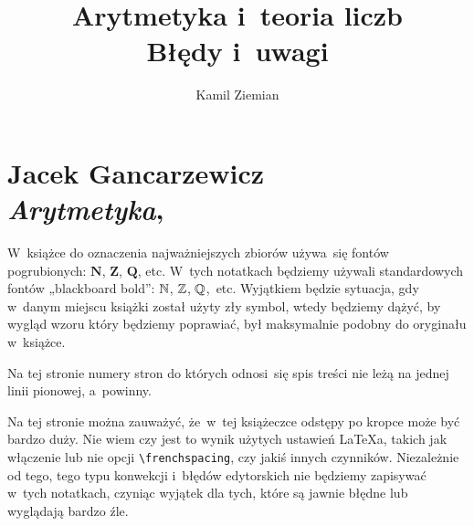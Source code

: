 \documentclass[a4paper,11pt]{article}
\title{Arytmetyka i~teoria liczb \\
  {\Large Błędy i~uwagi}}
\author{Kamil Ziemian}
\numberwithin{equation}{section}
\begin{document}





\maketitle %





\section{ %
  Jacek Gancarzewicz \\
  \textit{Arytmetyka}, \cite{GancarzewiczArytmetyka2000}}

\vspace{0em}



\vspace{0em}


\noindent
W~książce do oznaczenia najważniejszych zbiorów używa~się fontów
pogrubionych: $\mathbf{N}$, $\mathbf{Z}$, $\mathbf{Q}$, etc. W~tych
notatkach będziemy używali standardowych fontów „blackboard bold”: $\mathbb{N}$,
$\mathbb{Z}$, $\mathbb{Q}$,~etc. Wyjątkiem będzie sytuacja, gdy w~danym miejscu
książki został użyty zły symbol, wtedy będziemy dążyć, by wygląd wzoru który
będziemy poprawiać, był maksymalnie podobny do oryginału w~książce.

\VerSpaceFour






\vspace{0em}


\noindent
{} Na tej stronie numery stron do których odnosi~się spis treści nie
leżą na jednej linii pionowej, a~powinny.

\VerSpaceFour





\noindent
{} Na tej stronie można zauważyć, że~w~tej książeczce odstępy po kropce
może być bardzo duży. Nie wiem czy jest to wynik użytych ustawień \LaTeX a,
takich jak włączenie lub nie opcji \texttt{\textbackslash frenchspacing},
czy jakiś innych czynników. Niezależnie od tego, tego typu konwekcji
i~błędów edytorskich nie będziemy zapisywać w~tych notatkach, czyniąc
wyjątek dla tych, które są jawnie błędne lub wyglądają bardzo źle.
\end{document}

